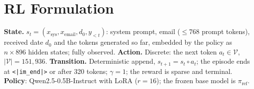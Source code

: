 \documentclass[conference,10pt]{IEEEtran}
\begin{document}
\begin{table}[t]
\centering\caption{Synthetic test set (300 emails, 40 without events), \%. Prompt: 1 = original system prompt, 2 = compact JSON prompt with worked
examples (also given to the baselines). No-event: share of the 40 no-event emails answered with $[\,]$. GRPO rows are
single runs; the configuration letters are defined in Sec.~\ref{sec:exp}.}\label{tab:results}
\scriptsize
\end{table}

\section{RL Formulation}
\textbf{State.} $s_t=(x_{\text{sys}},x_{\text{email}},d_0,y_{<t})$: system prompt, email ($\le$768 prompt tokens), received
date $d_0$ and the tokens generated so far, embedded by the policy as $n\times 896$ hidden states; fully observed.
\textbf{Action.} Discrete: the next token $a_t\in\mathcal V$, $|\mathcal V|=151{,}936$. \textbf{Transition.}
Deterministic append, $s_{t+1}=s_t\circ a_t$; the episode ends at \texttt{<|im\_end|>} or after 320 tokens;
$\gamma{=}1$; the reward is sparse and terminal. \textbf{Policy}: Qwen2.5-0.5B-Instruct \cite{qwen2024qwen25}
with LoRA \cite{hu2021lora} ($r{=}16$); the frozen base model is $\pi_{\text{ref}}$.
\end{document}
